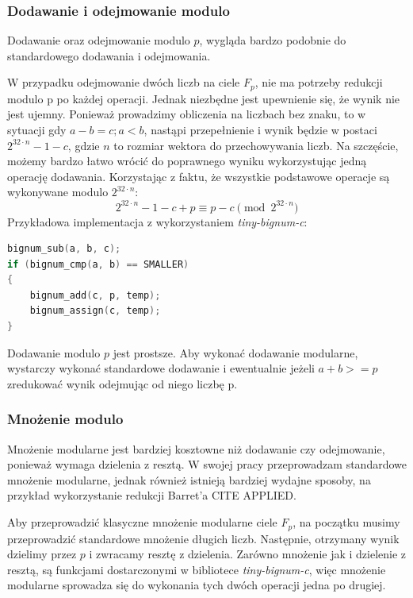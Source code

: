 \subsubsection{Dodawanie i odejmowanie modulo}
Dodawanie oraz odejmowanie modulo $p$, wygląda bardzo podobnie do standardowego dodawania i odejmowania.
\par
W przypadku odejmowanie dwóch liczb na ciele $F_{p}$, nie ma potrzeby redukcji modulo p po każdej operacji.
Jednak niezbędne jest upewnienie się, że wynik nie jest ujemny. Ponieważ prowadzimy obliczenia na liczbach bez znaku,
to w sytuacji gdy $a - b = c; a < b$, nastąpi przepełnienie i wynik będzie w postaci $2^{32 \cdot n}-1 - c$, gdzie $n$ to rozmiar
wektora do przechowywania liczb. Na szczęście, możemy bardzo łatwo wrócić do poprawnego wyniku wykorzystując jedną operację
dodawania. Korzystając z faktu, że wszystkie podstawowe operacje są wykonywane modulo $2^{32 \cdot n}$:
$$
    2^{32 \cdot n} - 1 - c + p \equiv p - c \pmod{2^{32 \cdot n}}
$$
Przykładowa implementacja z wykorzystaniem \textit{tiny-bignum-c}:

\begin{lstlisting}[language=C++]
bignum_sub(a, b, c);
if (bignum_cmp(a, b) == SMALLER)
{
    bignum_add(c, p, temp);
    bignum_assign(c, temp);
}
\end{lstlisting}
\par
Dodawanie modulo $p$ jest prostsze.
Aby wykonać dodawanie modularne, wystarczy wykonać standardowe dodawanie i ewentualnie jeżeli $a + b >= p$ zredukować wynik odejmując
od niego liczbę p.

\subsubsection{Mnożenie modulo}
Mnożenie modularne jest bardziej kosztowne niż dodawanie czy odejmowanie, ponieważ wymaga dzielenia z resztą.
W swojej pracy przeprowadzam standardowe mnożenie modularne, jednak również istnieją bardziej wydajne sposoby, na przykład wykorzystanie redukcji Barret'a CITE APPLIED.
\par
Aby przeprowadzić klasyczne mnożenie modularne ciele $F_{p}$, na początku musimy przeprowadzić standardowe mnożenie długich liczb.
Następnie, otrzymany wynik dzielimy przez $p$ i zwracamy resztę z dzielenia.
Zarówno mnożenie jak i dzielenie z resztą, są funkcjami dostarczonymi
w bibliotece \textit{tiny-bignum-c}, więc mnożenie modularne sprowadza się do wykonania tych dwóch operacji jedna po drugiej.

